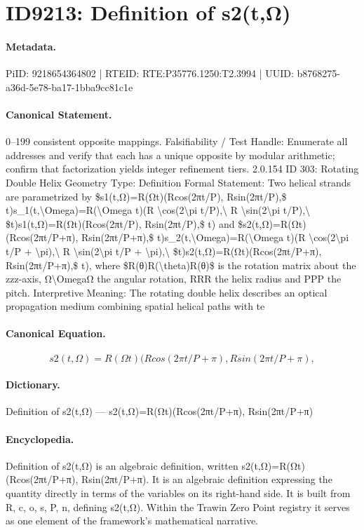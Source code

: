 \section*{ID9213: Definition of s2(t,Ω)}
\paragraph{Metadata.}
PiID: 9218654364802 | RTEID: RTE:P35776.1250:T2.3994 | UUID: b8768275-a36d-5e78-ba17-1bba9cc81c1e

\paragraph{Canonical Statement.}
0–199 consistent opposite mappings. Falsifiability / Test Handle: Enumerate all addresses and verify that each has a unique opposite by modular arithmetic; confirm that factorization yields integer refinement tiers. 2.0.154 ID 303: Rotating Double Helix Geometry Type: Definition Formal Statement: Two helical strands are parametrized by \$s1(t,Ω)=R(Ωt)(Rcos(2πt/P), Rsin(2πt/P),\$ t)s\_1(t,\textbackslash{}Omega)=R(\textbackslash{}Omega t)(R \textbackslash{}cos(2\textbackslash{}pi t/P),\textbackslash{} R \textbackslash{}sin(2\textbackslash{}pi t/P),\textbackslash{} \$t)s1(t,Ω)=R(Ωt)(Rcos(2πt/P), Rsin(2πt/P),\$ t) and \$s2(t,Ω)=R(Ωt)(Rcos(2πt/P+π), Rsin(2πt/P+π),\$ t)s\_2(t,\textbackslash{}Omega)=R(\textbackslash{}Omega t)(R \textbackslash{}cos(2\textbackslash{}pi t/P + \textbackslash{}pi),\textbackslash{} R \textbackslash{}sin(2\textbackslash{}pi t/P + \textbackslash{}pi),\textbackslash{} \$t)s2(t,Ω)=R(Ωt)(Rcos(2πt/P+π), Rsin(2πt/P+π),\$ t), where \$R(θ)R(\textbackslash{}theta)R(θ)\$ is the rotation matrix about the zzz-axis, Ω\textbackslash{}OmegaΩ the angular rotation, RRR the helix radius and PPP the pitch. Interpretive Meaning: The rotating double helix describes an optical propagation medium combining spatial helical paths with te

\paragraph{Canonical Equation.}
\[
s2(t,Ω)=R(Ωt)(Rcos(2πt/P+π), Rsin(2πt/P+π),
\]

\paragraph{Dictionary.}
Definition of s2(t,Ω) — s2(t,Ω)=R(Ωt)(Rcos(2πt/P+π), Rsin(2πt/P+π)

\paragraph{Encyclopedia.}
Definition of s2(t,Ω) is an algebraic definition, written s2(t,Ω)=R(Ωt)(Rcos(2πt/P+π), Rsin(2πt/P+π). It is an algebraic definition expressing the quantity directly in terms of the variables on its right-hand side. It is built from R, c, o, s, P, n, defining s2(t,Ω). Within the Trawin Zero Point registry it serves as one element of the framework's mathematical narrative.
